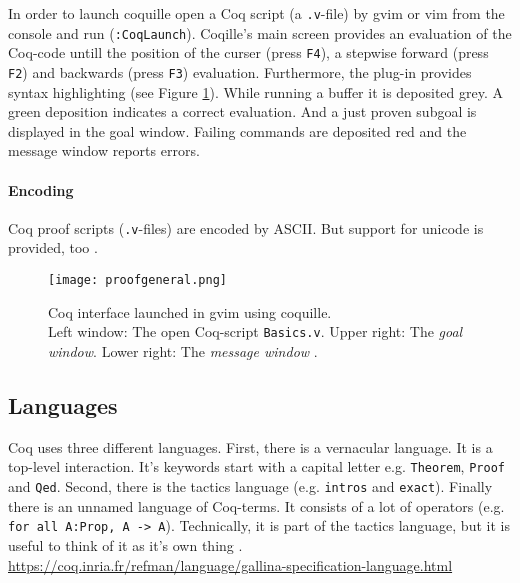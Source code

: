 In order to launch coquille open a Coq script (a \texttt{.v}-file) by gvim or vim from the console and run (\texttt{:CoqLaunch}). 
Coqille's main screen provides an evaluation of the Coq-code untill the position of the curser (press \texttt{F4}), a stepwise forward (press \texttt{F2}) and backwards (press \texttt{F3}) evaluation.                 
Furthermore, the plug-in provides syntax highlighting (see Figure \ref{fig:Coquille}).
While running a buffer it is deposited grey.
A green deposition indicates a correct evaluation. 
And a just proven subgoal is displayed in the goal window. 
Failing commands are deposited red and the message window reports errors.


\paragraph{Encoding}
\label{par:encoding}

Coq proof scripts (\texttt{.v}-files) are encoded by ASCII. But support for unicode is provided, too \cite{GallinaSpec}.


\begin{figure}[h]
\texttt{[image: proofgeneral.png]}
\caption{Coq interface launched in gvim using coquille.\\ 
Left window: The open Coq-script \texttt{Basics.v}.
Upper right: The {\itshape goal window}. 
Lower right: The {\itshape message window} \cite{COQIDE}.}
\label{fig:Coquille}
\end{figure}


\subsection{Languages}
\label{subsec:languages}

Coq uses three different languages. 
First, there is a vernacular language. 
It is a top-level interaction. 
It's keywords start with a capital letter e.g. \lstinline!Theorem!, \lstinline!Proof! and  \lstinline!Qed!. 
Second, there is the tactics language (e.g. \lstinline!intros! and \lstinline!exact!).
Finally there is an unnamed language of Coq-terms. 
It consists of a lot of operators (e.g. \lstinline!for all A:Prop, A -> A!).
Technically, it is part of the tactics language, but it is useful to think of it as it's own thing \cite{coq}.
\url{https://coq.inria.fr/refman/language/gallina-specification-language.html}